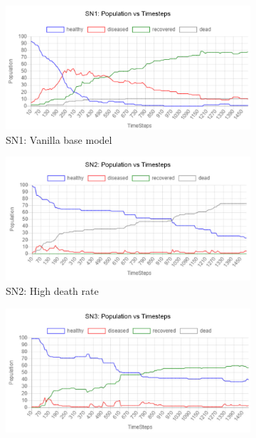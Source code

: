 \documentclass[a4paper,11pt]{article}
\begin{document}
    \begin{figure}[H]
        \centering
        \begin{subfigure}[b]{0.49\linewidth}
            \includegraphics[width=\linewidth]{pop_graphs/SN1_pop.png}
            \caption{SN1:  Vanilla base model}
            \label{fig:SN1}
        \end{subfigure}
        \begin{subfigure}[b]{0.49\linewidth}
            \includegraphics[width=\linewidth]{pop_graphs/SN2_pop.png}
            \caption{SN2:  High death rate}
            \label{fig:SN2}
        \end{subfigure}
        \begin{subfigure}[b]{0.49\linewidth}
            \includegraphics[width=\linewidth]{pop_graphs/SN3_pop.jpg}

\end{subfigure}
\end{figure}
\end{document}

